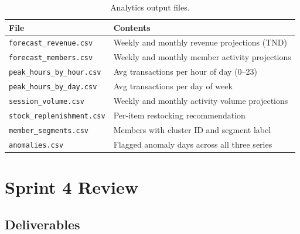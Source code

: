\begin{table}[H]
  \centering
  \caption{Analytics output files.\label{tab:output_forecasts}}
  \begin{tabular}{ll}
    \toprule
    \textbf{File} & \textbf{Contents} \\
    \midrule
    \texttt{forecast\_revenue.csv}       & Weekly and monthly revenue projections (TND) \\
    \texttt{forecast\_members.csv}       & Weekly and monthly member activity projections \\
    \texttt{peak\_hours\_by\_hour.csv}   & Avg transactions per hour of day (0--23) \\
    \texttt{peak\_hours\_by\_day.csv}    & Avg transactions per day of week \\
    \texttt{session\_volume.csv}         & Weekly and monthly activity volume projections \\
    \texttt{stock\_replenishment.csv}    & Per-item restocking recommendation \\
    \texttt{member\_segments.csv}        & Members with cluster ID and segment label \\
    \texttt{anomalies.csv}               & Flagged anomaly days across all three series \\
    \bottomrule
  \end{tabular}
\end{table}

\section{Sprint 4 Review}

\subsection{Deliverables}

